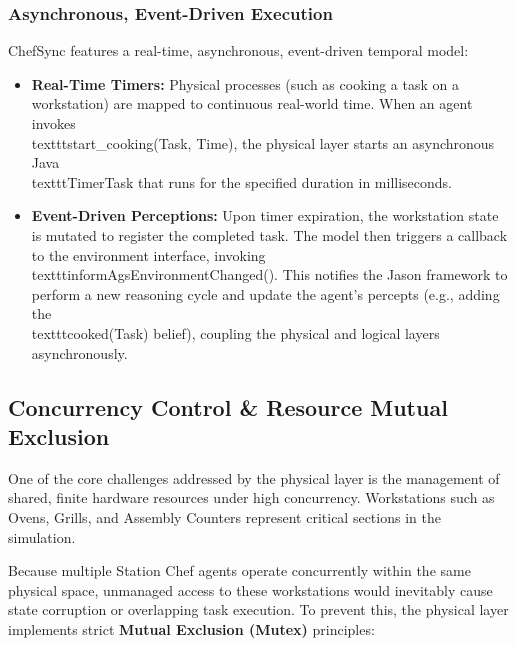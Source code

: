 \documentclass{scrartcl}
\begin{document}
\subsubsection{Asynchronous, Event-Driven Execution}
ChefSync features a real-time, asynchronous, event-driven temporal model:
\begin{itemize}
\item \textbf{Real-Time Timers:} Physical processes (such as cooking a task on a workstation) are mapped to continuous real-world time. When an agent invokes \\texttt{start\_cooking(Task, Time)}, the physical layer starts an asynchronous Java \\texttt{TimerTask} that runs for the specified duration in milliseconds.
\item \textbf{Event-Driven Perceptions:} Upon timer expiration, the workstation state is mutated to register the completed task. The model then triggers a callback to the environment interface, invoking \\texttt{informAgsEnvironmentChanged()}. This notifies the Jason framework to perform a new reasoning cycle and update the agent's percepts (e.g., adding the \\texttt{cooked(Task)} belief), coupling the physical and logical layers asynchronously.
\end{itemize}

\subsection{Concurrency Control \& Resource Mutual Exclusion}

One of the core challenges addressed by the physical layer is the management of shared, finite hardware resources under high concurrency. Workstations such as Ovens, Grills, and Assembly Counters represent critical sections in the simulation. 

Because multiple Station Chef agents operate concurrently within the same physical space, unmanaged access to these workstations would inevitably cause state corruption or overlapping task execution. To prevent this, the physical layer implements strict \textbf{Mutual Exclusion (Mutex)} principles:
\end{document}
